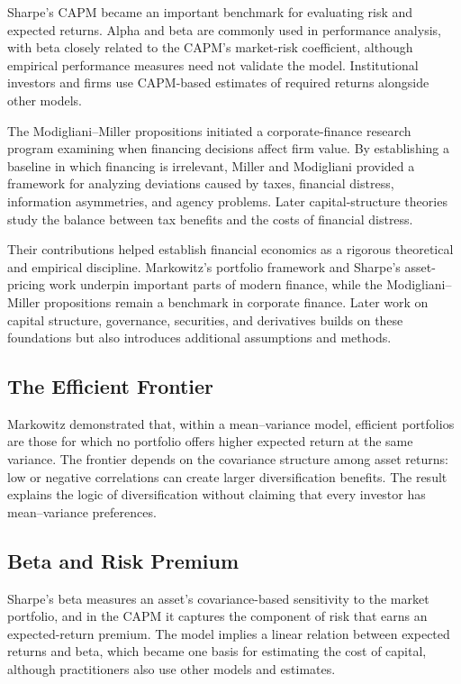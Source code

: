 Sharpe's CAPM became an important benchmark for evaluating risk and expected
returns. Alpha and beta are commonly used in performance analysis, with beta
closely related to the CAPM's market-risk coefficient, although empirical
performance measures need not validate the model. Institutional investors and
firms use CAPM-based estimates of required returns alongside other models.

The Modigliani--Miller propositions initiated a corporate-finance research
program examining when financing decisions affect firm value. By establishing
a baseline in which financing is irrelevant, Miller and Modigliani provided a
framework for analyzing deviations caused by taxes, financial distress,
information asymmetries, and agency problems. Later capital-structure theories
study the balance between tax benefits and the costs of financial distress.

Their contributions helped establish financial economics as a rigorous
theoretical and empirical discipline. Markowitz's portfolio framework and
Sharpe's asset-pricing work underpin important parts of modern finance, while
the Modigliani--Miller propositions remain a benchmark in corporate finance.
Later work on capital structure, governance, securities, and derivatives
builds on these foundations but also introduces additional assumptions and
methods.

\subsection*{The Efficient Frontier}
Markowitz demonstrated that, within a mean--variance model, efficient
portfolios are those for which no portfolio offers higher expected return at
the same variance. The frontier depends on the covariance structure among
asset returns: low or negative correlations can create larger diversification
benefits. The result explains the logic of diversification without claiming
that every investor has mean--variance preferences.

\subsection*{Beta and Risk Premium}
Sharpe's beta measures an asset's covariance-based sensitivity to the market
portfolio, and in the CAPM it captures the component of risk that earns an
expected-return premium. The model implies a linear relation between expected
returns and beta, which became one basis for estimating the cost of capital,
although practitioners also use other models and estimates.

